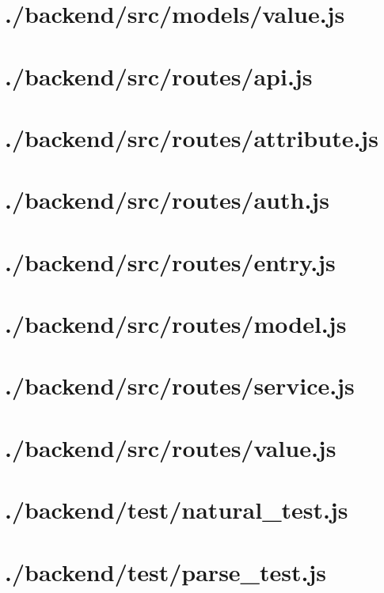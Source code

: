 \documentclass[11pt]{informatics-report}
\begin{document}
\newpage
\section{./backend/src/models/value.js}


\newpage
\section{./backend/src/routes/api.js}


\newpage
\section{./backend/src/routes/attribute.js}


\newpage
\section{./backend/src/routes/auth.js}


\newpage
\section{./backend/src/routes/entry.js}


\newpage
\section{./backend/src/routes/model.js}


\newpage
\section{./backend/src/routes/service.js}


\newpage
\section{./backend/src/routes/value.js}


\newpage
\section{./backend/test/natural\_test.js}


\newpage
\section{./backend/test/parse\_test.js}

\end{document}
